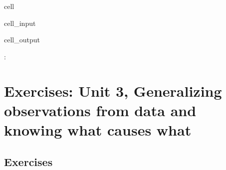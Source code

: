 \documentclass[letterpaper,10pt,english]{jupyterBook}
\begin{document}
\begin{sphinxuseclass}{cell}\begin{sphinxVerbatimInput}

\begin{sphinxuseclass}{cell_input}
\begin{sphinxVerbatim}[commandchars=\\\{\}]
\end{sphinxVerbatim}

\end{sphinxuseclass}\end{sphinxVerbatimInput}
\begin{sphinxVerbatimOutput}

\begin{sphinxuseclass}{cell_output}
\begin{sphinxVerbatim}[commandchars=\\\{\}]
          
  
:
\end{sphinxVerbatim}

\end{sphinxuseclass}\end{sphinxVerbatimOutput}

\end{sphinxuseclass}
\sphinxstepscope


\chapter{Exercises: Unit 3, Generalizing observations from data and knowing what causes what}
\label{\detokenize{exercises_unit_3:exercises-unit-3-generalizing-observations-from-data-and-knowing-what-causes-what}}\label{\detokenize{exercises_unit_3::doc}}

\section{Exercises}
\label{\detokenize{exercises_unit_3:exercises}}
\end{document}
